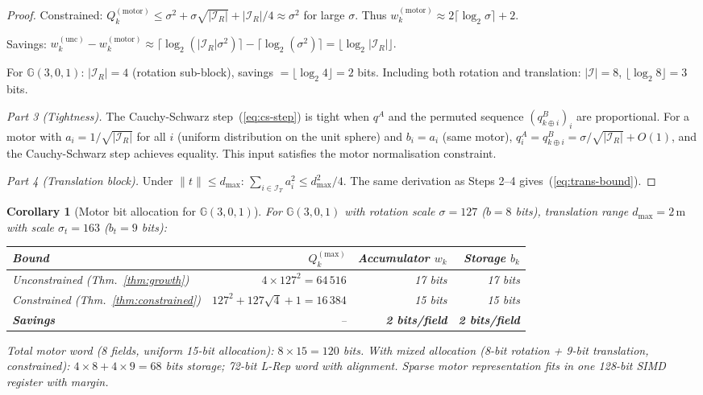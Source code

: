 \documentclass[11pt,a4paper]{article}
\theoremstyle{definition}
\theoremstyle{plain}
\newtheorem{corollary}{Corollary}[section]
\theoremstyle{remark}
\newcommand{\GA}{\mathbb{G}}
\begin{document}
\begin{proof}
Constrained:
$Q_k^{(\mathrm{motor})}\le\sigma^2+\sigma\sqrt{|\mathcal{I}_R|}+|\mathcal{I}_R|/4
\approx\sigma^2$ for large $\sigma$.
Thus $w_k^{(\mathrm{motor})}\approx 2\lceil\log_2\sigma\rceil+2$.

Savings:
$w_k^{(\mathrm{unc})}-w_k^{(\mathrm{motor})}
\approx\lceil\log_2(|\mathcal{I}_R|\sigma^2)\rceil-\lceil\log_2(\sigma^2)\rceil
=\lfloor\log_2|\mathcal{I}_R|\rfloor.$

For $\GA(3,0,1)$: $|\mathcal{I}_R|=4$ (rotation sub-block),
savings $=\lfloor\log_2 4\rfloor=2$ bits.
Including both rotation and translation: $|\mathcal{I}|=8$,
$\lfloor\log_2 8\rfloor=3$ bits.

\textit{Part 3 (Tightness).}
The Cauchy-Schwarz step~(\ref{eq:cs-step}) is tight when $q^A$ and
the permuted sequence $(q_{k\oplus i}^B)_i$ are proportional.
For a motor with $a_i=1/\sqrt{|\mathcal{I}_R|}$ for all $i$ (uniform
distribution on the unit sphere) and $b_i=a_i$ (same motor),
$q_i^A=q_{k\oplus i}^B=\sigma/\sqrt{|\mathcal{I}_R|}+O(1)$, and the
Cauchy-Schwarz step achieves equality.
This input satisfies the motor normalisation constraint.

\textit{Part 4 (Translation block).}
Under $\|t\|\le d_{\max}$: $\sum_{i\in\mathcal{I}_T}a_i^2\le d_{\max}^2/4$.
The same derivation as Steps 2--4 gives~(\ref{eq:trans-bound}).
\end{proof}

\begin{corollary}[Motor bit allocation for $\GA(3,0,1)$]
\label{cor:motor-bits}
For $\GA(3,0,1)$ with rotation scale $\sigma=127$ ($b=8$ bits),
translation range $d_{\max}=2\,\mathrm{m}$ with scale $\sigma_t=163$
($b_t=9$ bits):

\begin{center}
\begin{tabular}{lrrr}
\toprule
Bound & $Q_k^{(\mathrm{max})}$ & Accumulator $w_k$ & Storage $b_k$ \\
\midrule
Unconstrained (Thm.~\ref{thm:growth}) & $4\times127^2=64\,516$ & 17 bits & 17 bits \\
Constrained (Thm.~\ref{thm:constrained}) & $127^2+127\sqrt{4}+1=16\,384$ & 15 bits & 15 bits \\
\midrule
\textbf{Savings} & -- & \textbf{2 bits/field} & \textbf{2 bits/field} \\
\bottomrule
\end{tabular}
\end{center}

Total motor word (8 fields, uniform 15-bit allocation): $8\times15=120$ bits.
With mixed allocation (8-bit rotation + 9-bit translation, constrained):
$4\times8+4\times9=68$ bits storage; 72-bit L-Rep word with alignment.
Sparse motor representation fits in one 128-bit SIMD register with margin.
\end{corollary}
\end{document}
